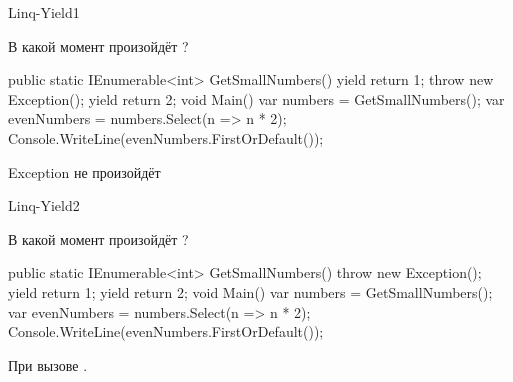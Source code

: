 \begin{defproblem}{Linq-Yield1}
\begin{onlyproblem}
  В какой момент произойдёт ?
  \begin{source}
  public static IEnumerable<int> GetSmallNumbers()
  {
    yield return 1;
    throw new Exception();
    yield return 2;
  }
  void Main()
  {
    var numbers = GetSmallNumbers();
    var evenNumbers = numbers.Select(n => n * 2);
    Console.WriteLine(evenNumbers.FirstOrDefault());
  }
  \end{source}
\end{onlyproblem}
\begin{onlysolution}
  Exception не произойдёт
\end{onlysolution}
\end{defproblem}
\begin{defproblem}{Linq-Yield2}
\begin{onlyproblem}
  В какой момент произойдёт ?
  \begin{source}
  public static IEnumerable<int> GetSmallNumbers()
  {
    throw new Exception();
    yield return 1;
    yield return 2;
  }
  void Main()
  {
    var numbers = GetSmallNumbers();
    var evenNumbers = numbers.Select(n => n * 2);
    Console.WriteLine(evenNumbers.FirstOrDefault());
  }
  \end{source}
\end{onlyproblem}
\begin{onlysolution}
  При вызове .
\end{onlysolution}
\end{defproblem}
